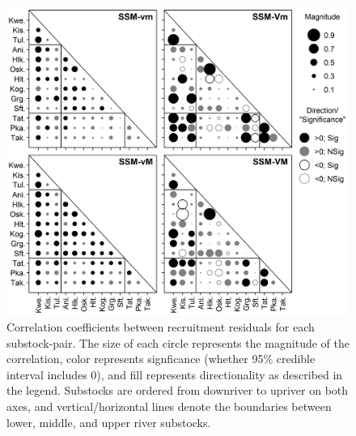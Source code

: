\documentclass[12pt,]{book}
\theoremstyle{definition}
\theoremstyle{definition}
\theoremstyle{definition}
\theoremstyle{remark}
\begin{document}
\begin{figure}
  \centering
  \includegraphics{img/Ch4/rhos.jpg}
  \caption{Correlation coefficients between recruitment residuals for each substock-pair. The size of each circle represents the magnitude of the correlation, color represents signficance (whether 95\% credible interval includes 0), and fill represents directionality as described in the legend. Substocks are ordered from downriver to upriver on both axes, and vertical/horizontal lines denote the boundaries between lower, middle, and upper river substocks.}
  \label{fig:rhos}
\end{figure}

\clearpage
\end{document}
